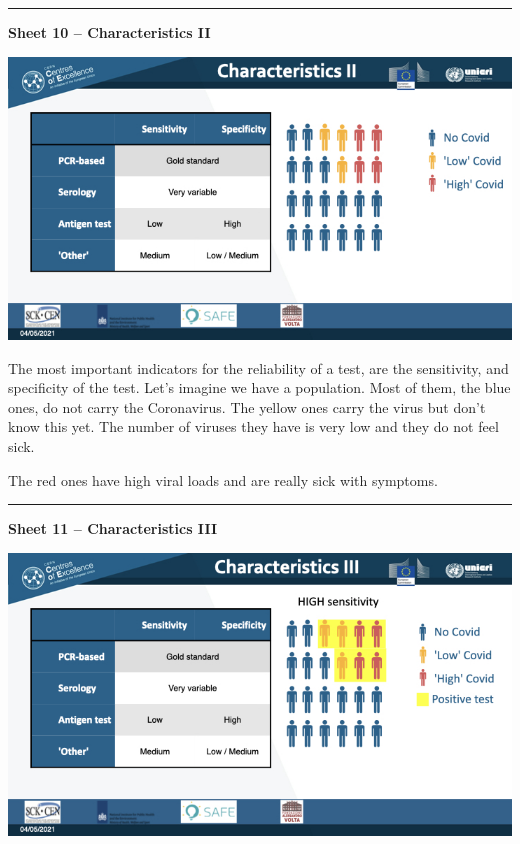 \documentclass[
]{book}
\newcommand{\RL}[1]{\beginR #1\endR}
\begin{document}
\begin{center}\rule{0.5\linewidth}{0.5pt}\end{center}

\textbf{Sheet 10 -- Characteristics II}

\includegraphics{images/m02/m02_types_of_rapid_tests_final.010.jpeg}

The most important indicators for the reliability of a test, are the
sensitivity, and specificity of the test. Let\RL{'}s imagine we
have a population. Most of them, the blue ones, do not carry the
Coronavirus. The yellow ones carry the virus but don\RL{'}t know
this yet. The number of viruses they have is very low and they do not
feel sick.

The red ones have high viral loads and are really sick with symptoms.

\begin{center}\rule{0.5\linewidth}{0.5pt}\end{center}

\textbf{Sheet 11 -- Characteristics III}

\includegraphics{images/m02/m02_types_of_rapid_tests_final.011.jpeg}
\end{document}
